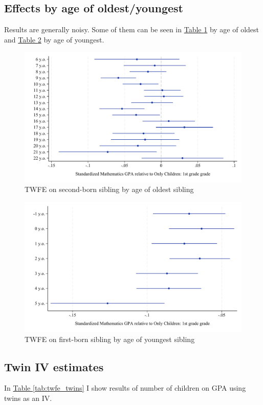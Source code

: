 \clearpage
\subsection{Effects by age of oldest/youngest}

Results are generally noisy. Some of them can be seen in \hyperref[fig:fig_by_age_oldest]{Table \ref{fig:fig_by_age_oldest}} by age of oldest and  \hyperref[fig:fig_by_age_youngest]{Table \ref{fig:fig_by_age_youngest}} by age of youngest.


\begin{figure}[htbp]
    \centering
        \includegraphics[width=\textwidth]{./FIGURES/TWFE/twfe_age_oldest_g1_gpa_m_adj_Tsiblings_2_Ssecond_4.pdf}
        \caption{TWFE on second-born sibling by age of oldest sibling}
        \label{fig:fig_by_age_oldest}

\end{figure}

\begin{figure}[htbp]
    \centering
    \includegraphics[width=\textwidth]{./FIGURES/TWFE/twfe_age_youngest_g1_gpa_m_adj_Tsiblings_2_Soldest_4.pdf}
        \caption{TWFE on first-born sibling by age of youngest sibling}
    \label{fig:fig_by_age_youngest}

\end{figure}

\clearpage
\subsection{Twin IV estimates}

In \hyperref[tab:twfe_twins]{Table \ref{tab:twfe_twins}} I show results of number of children on GPA using twins as an IV.





\newpage

